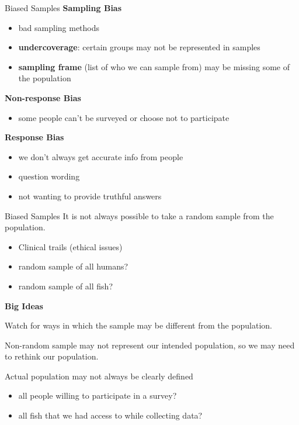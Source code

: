 \documentclass{beamer}
\begin{document}
\begin{frame}{Biased Samples}
\textbf{Sampling Bias}
\begin{itemize}
    \item bad sampling methods
    \item \textbf{undercoverage}: certain groups may not be represented in samples
    \item \textbf{sampling frame} (list of who we can sample from) may be missing some of the population
\end{itemize} \vspace{4mm}

\textbf{Non-response Bias}
\begin{itemize}
    \item some people can't be surveyed or choose not to participate
\end{itemize} \vspace{4mm}

\textbf{Response Bias}
\begin{itemize}
    \item we don't always get accurate info from people
    \item question wording
    \item not wanting to provide truthful answers
\end{itemize}
\end{frame}



\begin{frame}{Biased Samples}
It is not always possible to take a random sample from the population.
\begin{itemize}
    \item Clinical trails (ethical issues)
    \item random sample of all humans?
    \item random sample of all fish?
\end{itemize} \vspace{5mm}

\textbf{Big Ideas}

Watch for ways in which the sample may be different from the population. \vspace{3mm}

Non-random sample may not represent our intended population, so we may need to rethink our population. \vspace{3mm}

Actual population may not always be clearly defined
\begin{itemize}
    \item all people willing to participate in a survey?
    \item all fish that we had access to while collecting data?
\end{itemize}
\end{frame}
\end{document}
